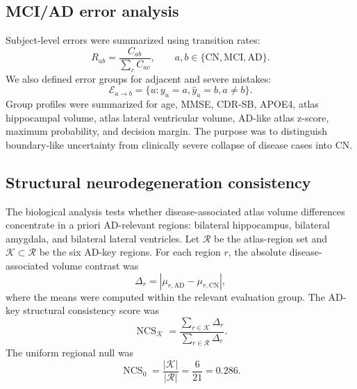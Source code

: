 \subsection{MCI/AD error analysis}
\label{sec:error_methods}

Subject-level errors were summarized using transition rates:
\begin{equation}
R_{ab}=
\frac{C_{ab}}{\sum_c C_{ac}},
\qquad
a,b\in\{\mathrm{CN},\mathrm{MCI},\mathrm{AD}\}.
\label{eq:transition_rates}
\end{equation}
We also defined error groups for adjacent and severe mistakes:
\begin{equation}
\mathcal{E}_{a\rightarrow b}
=
\{u:y_u=a,\hat{y}_u=b,a\neq b\}.
\label{eq:error_groups}
\end{equation}
Group profiles were summarized for age, MMSE, CDR-SB, APOE4, atlas hippocampal volume, atlas lateral ventricular volume, AD-like atlas z-score, maximum probability, and decision margin. The purpose was to distinguish boundary-like uncertainty from clinically severe collapse of disease cases into CN.

\subsection{Structural neurodegeneration consistency}
\label{sec:bio}

The biological analysis tests whether disease-associated atlas volume differences concentrate in a priori AD-relevant regions: bilateral hippocampus, bilateral amygdala, and bilateral lateral ventricles. Let $\mathcal{R}$ be the atlas-region set and $\mathcal{K}\subset\mathcal{R}$ be the six AD-key regions. For each region $r$, the absolute disease-associated volume contrast was
\begin{equation}
\Delta_r =
\left|
\mu_{r,\mathrm{AD}}-\mu_{r,\mathrm{CN}}
\right|,
\label{eq:region_delta}
\end{equation}
where the means were computed within the relevant evaluation group. The AD-key structural consistency score was
\begin{equation}
\operatorname{NCS}_{\mathcal{K}}
=
\frac{\sum_{r\in\mathcal{K}}\Delta_r}
{\sum_{r\in\mathcal{R}}\Delta_r}.
\label{eq:ncs}
\end{equation}
The uniform regional null was
\begin{equation}
\operatorname{NCS}_{0}=
\frac{|\mathcal{K}|}{|\mathcal{R}|}
=
\frac{6}{21}=0.286.
\label{eq:ncs_null}
\end{equation}

